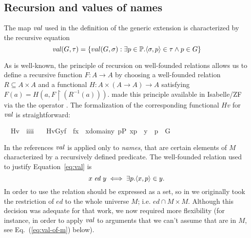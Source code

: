 \subsection{Recursion and values of names}

The map $\operatorname{\mathit{val}}$ used in the definition of the generic extension is
characterized by the recursive equation
\begin{equation}
  \label{eq:val}
  \val(G,\tau) = \{val(G,\sigma) :\exists p \in\PP .%
  \lb\sigma,p\rb \in \tau \wedge p \in G \}
\end{equation}

As is well-known, the principle of  recursion on
well-founded relations \cite[p.~48]{kunen2011set} allows us to define
a recursive function $F \colon A\to A$ by choosing a well-founded
relation $R \subseteq A\times A$ and a functional
$H\colon A\times (A \to A) \to A$ satisfying
$F(a)=H(a,F\!\upharpoonright\!(R^{-1}(a)))$. \citet{paulson1995set}
made this principle available in Isabelle/ZF via the the operator
. The formalization of the corresponding functional
$\mathit{Hv}$ for $\operatorname{\mathit{val}}$ is straightforward:
%
\begin{isabelle}
\isamarkupfalse%
\isanewline
\ \ Hv\ {\isacharcolon}{\isacharcolon}\ {\isachardoublequoteopen}i{\isasymRightarrow}i{\isasymRightarrow}i{\isasymRightarrow}i{\isachardoublequoteclose}\ \isanewline
\ \ {\isachardoublequoteopen}Hv{\isacharparenleft}G{\isacharcomma}y{\isacharcomma}f{\isacharparenright}\ {\isacharequal}{\isacharequal}\ {\isacharbraceleft}f{\isacharbackquote}x\ {\isachardot}{\isachardot}\ x{\isasymin}domain{\isacharparenleft}y{\isacharparenright}{\isacharcomma}\ {\isasymexists}p{\isasymin}P{\isachardot}\ {\isacharless}x{\isacharcomma}p{\isachargreater}\ {\isasymin}\ y\ {\isasymand}\ p\ {\isasymin}\ G\ {\isacharbraceright}{\isachardoublequoteclose}
\end{isabelle}
In the references \cite{kunen2011set,weaver2014forcing} $\operatorname{\mathit{val}}$ is
applied only to \emph{names}, that are certain elements of $M$
characterized by a recursively defined predicate. The well-founded
relation used to justify Equation~\eqref{eq:val} is
\[ x \mathrel{\mathit{ed}} y \iff \exists p . \langle x,p\rangle\in y. \] In
order to use  the relation should be expressed as a set, so
in \cite{2018arXiv180705174G} we originally took the restriction of
$\mathit{ed}$ to the whole universe 
$M$; i.e. $\mathit{ed}\cap M\times M$.  Although this decision was
adequate for that work, we now required more flexibility (for
instance, in order to apply $\operatorname{\mathit{val}}$ to arguments that we can't assume
that are in $M$, see Eq.~(\ref{eq:val-of-m}) below).

